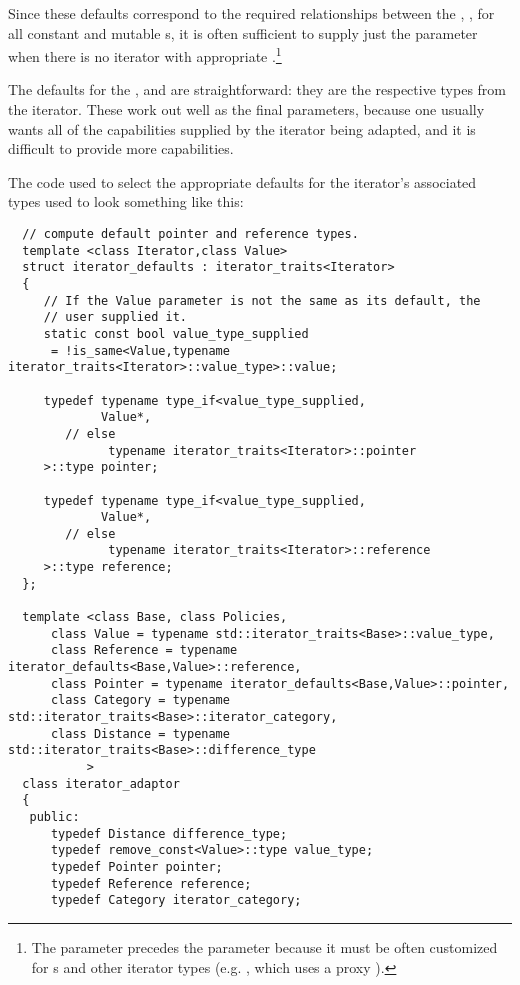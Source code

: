 \documentclass{netobjectdays}
\begin{document}
Since these defaults correspond to the required relationships between
the , ,  for all
constant and mutable s, it is often
sufficient to supply just the  parameter when there is no
 iterator with appropriate
.\footnote{The  parameter
precedes the  parameter because it must be often
customized for s and other iterator types
(e.g. , which uses a proxy
).}

The defaults for the ,
and  are straightforward: they are the
respective types from the  iterator. These work out well as
the final parameters, because one usually wants all of the 
capabilities supplied by the iterator being adapted, and it is
difficult to provide more capabilities.

The code used to select the appropriate defaults for the iterator's
associated types used to look something like this:

{\footnotesize
\begin{verbatim}
  // compute default pointer and reference types.
  template <class Iterator,class Value>
  struct iterator_defaults : iterator_traits<Iterator>
  {
     // If the Value parameter is not the same as its default, the
     // user supplied it. 
     static const bool value_type_supplied
      = !is_same<Value,typename iterator_traits<Iterator>::value_type>::value;

     typedef typename type_if<value_type_supplied,
             Value*,
        // else
              typename iterator_traits<Iterator>::pointer
     >::type pointer;

     typedef typename type_if<value_type_supplied,
             Value*,
        // else
              typename iterator_traits<Iterator>::reference
     >::type reference;
  };

  template <class Base, class Policies, 
      class Value = typename std::iterator_traits<Base>::value_type,
      class Reference = typename iterator_defaults<Base,Value>::reference,
      class Pointer = typename iterator_defaults<Base,Value>::pointer,
      class Category = typename std::iterator_traits<Base>::iterator_category,
      class Distance = typename std::iterator_traits<Base>::difference_type
           >
  class iterator_adaptor
  {
   public:
      typedef Distance difference_type;
      typedef remove_const<Value>::type value_type;
      typedef Pointer pointer;
      typedef Reference reference;
      typedef Category iterator_category;
\end{verbatim}
}
\end{document}
